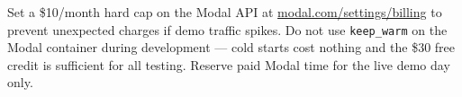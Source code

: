 \documentclass[11pt]{article}
\begin{document}
Set a \$10/month hard cap on the Modal API at \url{modal.com/settings/billing}
to prevent unexpected charges if demo traffic spikes.
Do not use \texttt{keep\_warm} on the Modal container during development ---
cold starts cost nothing and the \$30 free credit is sufficient for all
testing. Reserve paid Modal time for the live demo day only.
\end{document}
